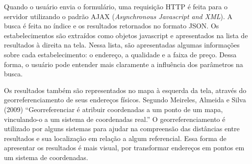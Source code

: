 Quando o usuário envia o formulário, uma requisição HTTP é feita para o servidor utilizando o padrão AJAX (\emph{Asynchronous Javascript and XML}). A busca é feita no índice e os resultados retornados no formato JSON. Os estabelecimentos são extraídos como objetos javascript e apresentados na lista de resultados à direita na tela. Nessa lista, são apresentadas algumas informações sobre cada estabelecimento: o endereço, a qualidade e a faixa de preço. Dessa forma, o usuário pode entender mais claramente a influência dos parâmetros na busca.

Os resultados também são representados no mapa à esquerda da tela, através do georreferenciamento de seus endereços físicos. Segundo Meireles, Almeida e Silva (2009) ``Georreferenciar é atribuir coordenadas a um ponto de um mapa, vinculando-o a um sistema de coordenadas real.'' O georreferenciamento é utilizado por alguns sistemas para ajudar na compreensão das distâncias entre resultados e sua localização em relação a algum referencial. Essa forma de apresentar os resultados é mais visual, por transformar endereços em pontos em um sistema de coordenadas. 